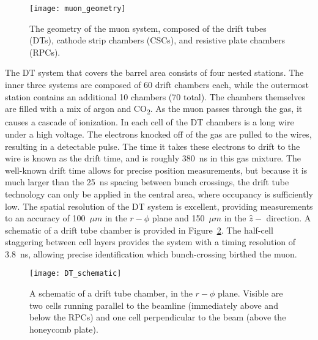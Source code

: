\begin{figure}[h]
\centering
\texttt{[image: muon\_geometry]}
\caption[The geometry of the CMS muon system.]{The geometry of the muon system, composed of the drift tubes (DTs),
cathode strip chambers (CSCs), and resistive plate chambers (RPCs).}
\label{fig:muonGeometry}
\end{figure}

The DT system that covers the barrel area consists of four nested stations. The
inner three systems are composed of 60 drift chambers each, while the outermost
station contains an additional 10 chambers (70 total). The chambers themselves
are filled with a mix of argon and CO\textsubscript{2}. As the muon passes
through the gas, it causes a cascade of ionization. In each cell of the DT
chambers is a long wire under a high voltage. The electrons knocked off of the
gas are pulled to the wires, resulting in a detectable pulse. The time it takes
these electrons to drift to the wire is known as the drift time, and is roughly
380~ns in this gas mixture. The well-known drift time allows for precise
position measurements, but because it is much larger than the 25~ns spacing
between bunch crossings, the drift tube technology can only be applied in the
central area, where occupancy is sufficiently low. The spatial resolution of the
DT system is excellent, providing measurements to an accuracy of 100~$\mu m$ in
the $r-\phi$ plane and 150~$\mu m$ in the $\hat z-$ direction. A schematic of a
drift tube chamber is provided in Figure~\ref{fig:DT}. The half-cell staggering
between cell layers provides the system with a timing resolution of 3.8~ns,
allowing precise identification which bunch-crossing birthed the muon. 

\begin{figure}[h]
\centering
\texttt{[image: DT\_schematic]}
\caption[A schematic drawing of a drift tube chamber.]{A schematic of a drift tube chamber, in the $r-\phi$ plane. Visible are
two cells running parallel to the beamline (immediately above and below the
RPCs) and one cell perpendicular to the beam (above the honeycomb plate).}
\label{fig:DT}
\end{figure}

